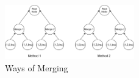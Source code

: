 

\begin{figure}[H]
    \centering
    \includegraphics[width = 0.5\textwidth]{diagrams/good_vs_bad_merges.pdf}
    \caption{Ways of Merging}
    \label{Figure 3}
\end{figure}

